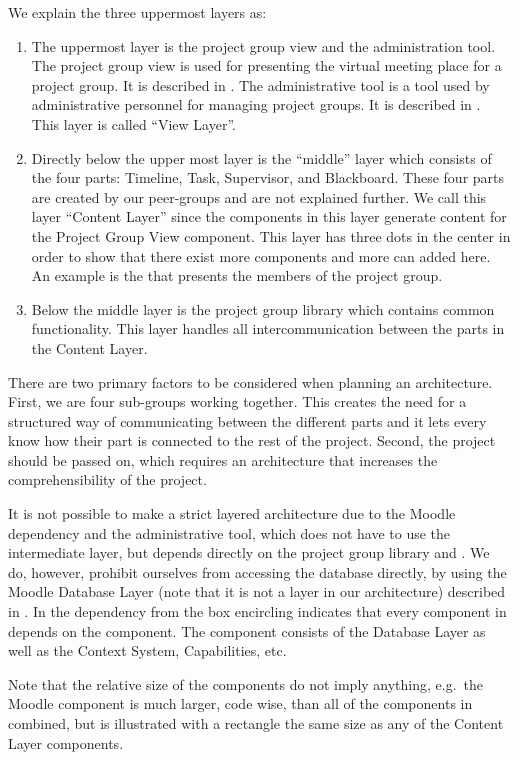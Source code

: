 We explain the three uppermost layers as:
\begin{enumerate}
	\item The uppermost layer is the project group view and the administration tool.
	The project group view is used for presenting the virtual meeting place for a project group.
	It is described in .
	The administrative tool is a tool used by administrative personnel for managing project groups.
	It is described in .
	This layer is called ``View Layer''.
	\item Directly below the upper most layer is the ``middle'' layer which consists of the four parts: Timeline, Task, Supervisor, and Blackboard.
	These four parts are created by our peer-groups and are not explained further.
	We call this layer ``Content Layer'' since the components in this layer generate content for the Project Group View component.
	This layer has three dots in the center in order to show that there exist more components and more can added here. 
	An example is the \detdeandrelaver{} that presents the members of the project group. 
	\item Below the middle layer is the project group library which contains common functionality.
	This layer handles all intercommunication between the parts in the Content Layer.  
\end{enumerate}


There are two primary factors to be considered when planning an architecture. 
First, we are four sub-groups working together. 
This creates the need for a structured way of communicating between the different parts and it lets every \subgroup{} know how their part is connected to the rest of the project. 
Second, the project should be passed on, which requires an architecture that increases the comprehensibility of the project.

It is not possible to make a strict layered architecture due to the Moodle dependency and the administrative tool, which does not have to use the intermediate layer, but depends directly on the project group library and \moodle{}.
We do, however, prohibit ourselves from accessing the database directly, by using the Moodle Database Layer (note that it is not a layer in our architecture) described in .
In  the dependency from the box encircling \system{} indicates that every component in \system{} depends on the \moodle{} component.
The \moodle{} component consists of the Database Layer as well as the Context System, Capabilities, etc.

Note that the relative size of the components do not imply anything, e.g.\ the Moodle component is much larger, code wise, than all of the components in \system{} combined, but is illustrated with a rectangle the same size as any of the Content Layer components.













